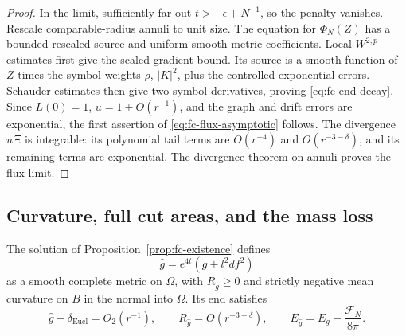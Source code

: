 \begin{proof}
In the limit, sufficiently far out $t> -\epsilon+N^{-1}$, so the
penalty vanishes.  Rescale comparable-radius annuli to unit size.
The equation for $\Phi_N(Z)$ has a bounded rescaled source and
uniform smooth metric coefficients.  Local $W^{2,p}$ estimates
first give the scaled gradient bound.  Its source is a smooth
function of $Z$ times the symbol weights $\rho$, $|K|^2$, plus
the controlled exponential errors.  Schauder estimates then give
two symbol derivatives, proving \eqref{eq:fc-end-decay}.
Since $L(0)=1$, $u=1+O(r^{-1})$, and the graph and drift errors
are exponential, the first assertion of
\eqref{eq:fc-flux-asymptotic} follows.  The divergence $u\Xi$ is
integrable: its polynomial tail terms are $O(r^{-4})$ and
$O(r^{-3-\delta})$, and its remaining terms are exponential.
The divergence theorem on annuli proves the flux limit.
\end{proof}

\subsection{Curvature, full cut areas, and the mass loss}

\begin{lemma}\label{lem:fc-comparison-metric}
The solution of Proposition~\ref{prop:fc-existence} defines
\[
 \widehat g=e^{4t}(g+l^2df^2)
\]
as a smooth complete metric on $\Omega$, with $R_{\widehat g}\ge0$
and strictly negative mean curvature on $B$ in the normal into
$\Omega$.  Its end satisfies
\[
 \widehat g-\delta_{\mathrm{Eucl}}=O_2(r^{-1}),\qquad
 R_{\widehat g}=O(r^{-3-\delta}),\qquad
 E_{\widehat g}=E_g-\frac{\mathcal F_N}{8\pi}.
\]
\end{lemma}


